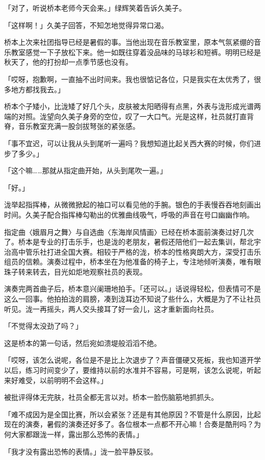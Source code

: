\documentclass[UTF8]{ctexart}
\begin{document}
    「对了，听说桥本老师今天会来。」绿辉笑着告诉久美子。 

    「这样啊！」久美子回答，不知怎地觉得异常口渴。 

    桥本上次来社团指导已经是暑假的事。当他出现在音乐教室里，原本气氛紧绷的音乐教室感觉一下子放松下来。他一如既往穿着没品味的马球衫和短裤。明明已经是秋天了，他的打扮却一点季节感也没有。 

    「哎呀，抱歉啊，一直抽不出时间来。我也很惦记各位，只是我实在太优秀了，很多地方都找我去。」 

    桥本个子矮小，比泷矮了好几个头，皮肤被太阳晒得有点黑，外表与泷形成光谱两端的对照。泷望向久美子身旁的空位，叹了一大口气。光是这样，社员就打直背脊，音乐教室充满一股剑拔弩张的紧张感。 

    「事不宜迟，可以让我从头到尾听一遍吗？我想知道比起关西大赛的时候，你们进步了多少。」 

    「这个嘛……那就从指定曲开始，从头到尾吹一遍。」 

    「好。」 

    泷举起指挥棒，从微微掀起的袖口可以看见他的手腕。银色的手表慢吞吞地刻画出时间。久美子配合指挥棒勾勒出的优雅曲线吸气，呼吸的声音在号口幽幽作响。 

    指定曲〈娥眉月之舞〉与自选曲〈东海岸风情画〉已经在桥本面前演奏过好几次了。桥本是专业的打击乐手，也是泷的老朋友，暑假还陪他们一起去集训，帮北宇治高中管乐社打进全国大赛。相较于严格的泷，桥本的性格爽朗大方，深受打击乐组员的信赖。演奏过程中，桥本坐在为他准备的椅子上，专注地倾听演奏，唯有眼珠子转来转去，目光如炬地观察社员的表现。 

    演奏完两首曲子后，桥本意兴阑珊地拍手。「还可以。」话说得轻松，但表情可不是这么一回事。他拍拍泷的肩膀，凑到泷耳边不知说了些什么，大概是为了不让社员听见。泷一再摇头，两人交头接耳了好一会儿，这才重新面向社员。 

    「不觉得太没劲了吗？」 

    这是桥本的第一句话，然后宛如溃堤般滔滔不绝。 

    「哎呀，该怎么说呢，各位是不是比上次退步了？声音僵硬又死板，我也知道开学以后，练习时间变少了，要维持以前的水准并不容易，可是啊，该怎么说呢，听起来好难受，以前明明不会这样。」 

    被批评得体无完肤，社员全都无言以对。桥本一脸伤脑筋地抓抓头。 

    「难不成因为是全国比赛，所以会紧张？还是有其他原因？不管是什么原因，比起现在的演奏，暑假的演奏还好多了。各位根本一点都不开心嘛！合奏是酷刑吗？为何大家都跟泷一样，露出那么恐怖的表情。」 

    「我才没有露出恐怖的表情。」泷一脸平静反驳。 
\end{document}
